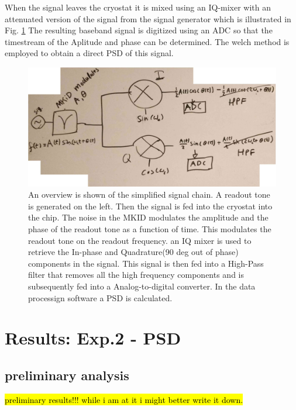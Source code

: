 When the signal leaves the cryostat it is mixed using an IQ-mixer with an attenuated version of the signal from the signal generator which is illustrated in Fig. \ref{} The resulting baseband signal is digitized using an ADC so that the timestream of the Aplitude and phase can be determined.
The welch method is employed to obtain a direct PSD of this signal.
\begin{figure}[ht]
	\centering
	\includegraphics[width=.80\linewidth]{figures/ch5_measurement/PSD_IQmixing_overview_Edit.jpg}
	\caption{An overview is shown of the simplified signal chain. A readout tone is generated on the left. Then the signal is fed into the cryostat into the chip. The noise in the MKID modulates the amplitude and the phase of the readout tone as a function of time. This modulates the readout tone on the readout frequency. an IQ mixer is used to retrieve the In-phase and Quadrature(90 deg out of phase) components in the signal. This signal is then fed into a High-Pass filter that removes all the high frequency components and is subsequently fed into a Analog-to-digital converter. In the data processign software a PSD is calculated.  }
	\label{fig:ch6_Signal_overview}
\end{figure}




\section{Results: Exp.2 - PSD}
\subsection*{preliminary analysis}
\hl{preliminary results!!! while i am at it i might better write it down.}


